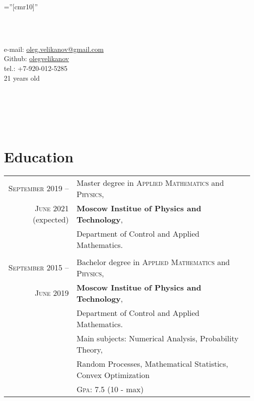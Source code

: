 \documentclass[a4paper,10pt]{article}
\begin{document}
\pagestyle{empty} 						    %

\font\fb=''[cmr10]''                        %

\par{
	\par
}



\begin{center}

    \\\

    e-mail: \href{mailto:oleg.velikanov@gmail.com}{oleg.velikanov@gmail.com} \\
    Github: \href{https://github.com/olegvelikanov}{olegvelikanov} \\
    tel.: +7-920-012-5285\\
    21 years old\\
     
     \\\
     
     \\\
    \hfill 
\end{center}

\section{Education}
\begin{tabular}{rl}
    \textsc{September}  2019 -- 
    & Master degree in \textsc{Applied Mathematics} and \textsc{Physics},\\
    \textsc{June}  2021 (expected)
    &\normalsize\textbf{Moscow Institue of Physics and Technology},\\
    &Department of Control and Applied Mathematics.\\
    
    \\
    
    \textsc{September}  2015 -- 
    & Bachelor degree in \textsc{Applied Mathematics} and \textsc{Physics},\\
    \textsc{June}  2019
    &\normalsize\textbf{Moscow Institue of Physics and Technology},\\
    &Department of Control and Applied Mathematics.\\
    &Main subjects: Numerical Analysis, Probability Theory,\\ 
    &Random Processes, Mathematical Statistics, Convex Optimization \\ \bigskip
    &\normalsize \textsc{Gpa}: 7.5 (10 - max)\\  
\end{tabular}
\end{document}
